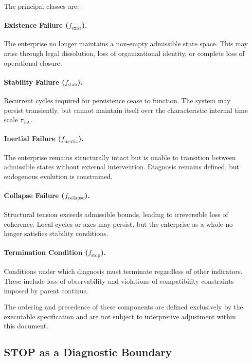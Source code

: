 The principal classes are:

\paragraph{Existence Failure ($f_{\text{exist}}$).}
The enterprise no longer maintains a non-empty admissible state space.
This may arise through legal dissolution, loss of organizational
identity, or complete loss of operational closure.

\paragraph{Stability Failure ($f_{\text{stab}}$).}
Recurrent cycles required for persistence cease to function.
The system may persist transiently, but cannot maintain itself over the
characteristic internal time scale $\tau_{\mathrm{EA}}$.

\paragraph{Inertial Failure ($f_{\text{inertia}}$).}
The enterprise remains structurally intact but is unable to transition
between admissible states without external intervention.
Diagnosis remains defined, but endogenous evolution is constrained.

\paragraph{Collapse Failure ($f_{\text{collapse}}$).}
Structural tension exceeds admissible bounds, leading to irreversible
loss of coherence.
Local cycles or axes may persist, but the enterprise as a whole no
longer satisfies stability conditions.

\paragraph{Termination Condition ($f_{\text{stop}}$).}
Conditions under which diagnosis must terminate regardless of other
indicators.
These include loss of observability and violations of compatibility
constraints imposed by parent continua.

The ordering and precedence of these components are defined exclusively
by the executable specification and are not subject to interpretive
adjustment within this document.

\subsection{STOP as a Diagnostic Boundary}

